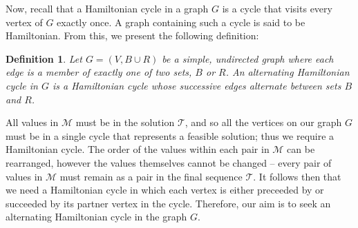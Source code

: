 \documentclass[a4paper,11pt,authoryear]{elsarticle}
\newtheorem{definition}{Definition}
\begin{document}

\noindent Now, recall that a Hamiltonian cycle in a graph $G$ is a cycle that visits every vertex of $G$ exactly once. A graph containing such a cycle is said to be Hamiltonian. From this, we present the following definition:

\begin{definition} %
	Let $G = (V, B \cup R)$ be a simple, undirected graph where each edge is a member of exactly one of two sets, $B$ or $R$. An \emph{alternating Hamiltonian cycle} in $G$ is a Hamiltonian cycle whose successive edges alternate between sets $B$ and $R$.
	\label{defn:althamcycle}
\end{definition}

\noindent All values in $\mathcal{M}$ must be in the solution $\mathcal{T}$, and so all the vertices on our graph $G$ must be in a single cycle that represents a feasible solution; thus we require a Hamiltonian cycle. The order of the values within each pair in $\mathcal{M}$ can be rearranged, however the values themselves cannot be changed -- every pair of values in $\mathcal{M}$ must remain as a pair in the final sequence $\mathcal{T}$. It follows then that we need a Hamiltonian cycle in which each vertex is either preceeded by or succeeded by its partner vertex in the cycle. Therefore, our aim is to seek an alternating Hamiltonian cycle in the graph $G$.

\end{document}
